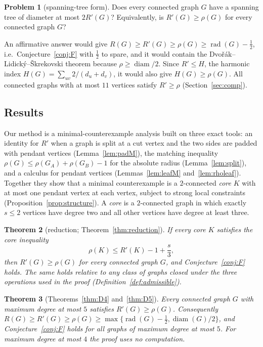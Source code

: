 \documentclass[11pt]{amsart}
\newtheorem{theorem}{Theorem}[section]
\theoremstyle{definition}
\newtheorem{problem}[theorem]{Problem}
\newcommand{\rad}{\operatorname{rad}}
\newcommand{\diam}{\operatorname{diam}}
\newcommand{\Rp}{R'}
\begin{document}
\begin{problem}[spanning-tree form]\label{prob:main}
Does every connected graph $G$ have a spanning tree of diameter at most $2\Rp(G)$? Equivalently, is
$\Rp(G)\ge\rho(G)$ for every connected graph $G$?
\end{problem}

An affirmative answer would give $R(G)\ge\Rp(G)\ge\rho(G)\ge\rad(G)-\frac12$, i.e.\ Conjecture~\ref{conj:F} with
$\frac12$ to spare, and it would contain the Dvo\v{r}\'ak--Lidick\'y--\v{S}krekovski theorem because
$\rho\ge\diam/2$. Since $\Rp\le H$, the harmonic index $H(G)=\sum_{uv}2/(d_u+d_v)$, it would also give
$H(G)\ge\rho(G)$. All connected graphs with at most $11$ vertices satisfy $\Rp\ge\rho$ (Section~\ref{sec:comp}).

\subsection{Results}
Our method is a minimal-counterexample analysis built on three exact tools: an identity for $\Rp$ when a graph is
split at a cut vertex and the two sides are padded with pendant vertices (Lemma~\ref{lem:padM}), the matching
inequality $\rho(G)\le\rho(G_A)+\rho(G_B)-1$ for the absolute radius (Lemma~\ref{lem:split}), and a calculus for
pendant vertices (Lemmas~\ref{lem:leafM} and~\ref{lem:rholeaf}). Together they show that a minimal
counterexample is a $2$-connected \emph{core} $K$ with at most one pendant vertex at each vertex, subject to strong
local constraints (Proposition~\ref{prop:structure}). A \emph{core} is a $2$-connected graph in which exactly $s\le2$
vertices have degree two and all other vertices have degree at least three.

\begin{theorem}[reduction; Theorem~\ref{thm:reduction}]\label{thm:intro-red}
If every core $K$ satisfies the \emph{core inequality}
\begin{equation}\label{eq:core-intro}
\rho(K)\le\Rp(K)-1+\frac s3,
\end{equation}
then $\Rp(G)\ge\rho(G)$ for every connected graph $G$, and Conjecture~\ref{conj:F} holds. The same holds relative to
any class of graphs closed under the three operations used in the proof (Definition~\ref{def:admissible}).
\end{theorem}

\begin{theorem}[Theorems~\ref{thm:D4} and~\ref{thm:D5}]\label{thm:intro-deg}
Every connected graph $G$ with maximum degree at most $5$ satisfies $\Rp(G)\ge\rho(G)$. Consequently
$R(G)\ge\Rp(G)\ge\rho(G)\ge\max\{\rad(G)-\frac12,\diam(G)/2\}$, and Conjecture~\ref{conj:F} holds for all graphs of
maximum degree at most $5$. For maximum degree at most $4$ the proof uses no computation.
\end{theorem}
\end{document}
